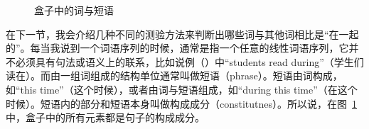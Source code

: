 \begin{figure}
\centering
{}
\caption{\label{Abbildung-Schachteln}盒子中的词与短语}
\end{figure}%

\noindent
在下一节，我会介绍几种不同的测验方法来判断出哪些词与其他词相比是“在一起的”。每当我说到一个词语序列的时候，通常是指一个任意的线性词语序列，它并不必须具有句法或语义上的联系，比如说例（）中“students read during”（学生们读在）。而由一组词组成的结构单位通常叫做短语（phrase）。短语由词构成，如“this time”（这个时候），或者由词与短语组成，如“during this time”（在这个时候）。短语内的部分和短语本身叫做构成成分（constitutnes）。所以说，在图~\ref{Abbildung-Schachteln}中，盒子中的所有元素都是句子的构成成分。


